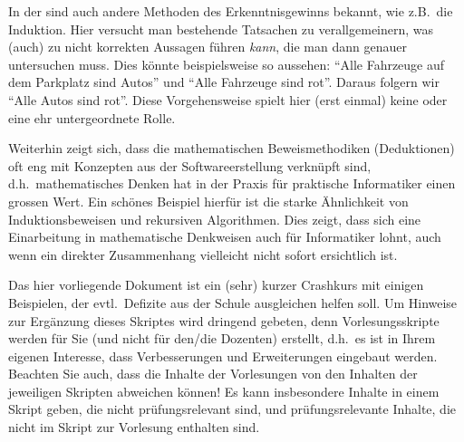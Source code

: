 In der  sind auch andere Methoden des
Erkenntnisgewinns bekannt, wie z.B.~die Induktion. Hier versucht man
bestehende Tatsachen zu verallgemeinern, was (auch) zu nicht korrekten
Aussagen führen \emph{kann}, die man dann genauer untersuchen
muss. Dies könnte beispielsweise so aussehen: "`Alle Fahrzeuge auf dem
Parkplatz sind Autos"' und "`Alle Fahrzeuge sind rot"'. Daraus folgern
wir "`Alle Autos sind rot"'. Diese Vorgehensweise spielt hier (erst
einmal) keine oder eine ehr untergeordnete Rolle.

\bigskip

Weiterhin zeigt sich, dass die mathematischen Beweismethodiken
(Deduktionen) oft eng mit Konzepten aus der Softwareerstellung
verknüpft sind, d.h.~mathematisches Denken hat in der Praxis für
praktische Informatiker einen grossen Wert. Ein schönes Beispiel
hierfür ist die starke Ähnlichkeit von Induktionsbeweisen und
rekursiven Algorithmen. Dies zeigt, dass sich eine Einarbeitung in
mathematische Denkweisen auch für Informatiker lohnt, auch wenn ein
direkter Zusammenhang vielleicht nicht sofort ersichtlich ist.

\bigskip

Das hier vorliegende Dokument ist ein (sehr) kurzer Crashkurs mit einigen
Beispielen, der evtl.~Defizite aus der Schule ausgleichen helfen
soll. Um Hinweise zur Ergänzung dieses Skriptes wird dringend gebeten,
denn Vorlesungsskripte werden für Sie (und nicht für den/die Dozenten)
erstellt, d.h.~es ist in Ihrem eigenen Interesse, dass Verbesserungen und
Erweiterungen eingebaut werden. Beachten Sie auch, dass die Inhalte
der Vorlesungen von den Inhalten der jeweiligen Skripten abweichen
können! Es kann insbesondere Inhalte in einem Skript geben, die nicht
prüfungsrelevant sind, und prüfungsrelevante Inhalte, die nicht im
Skript zur Vorlesung enthalten sind.

